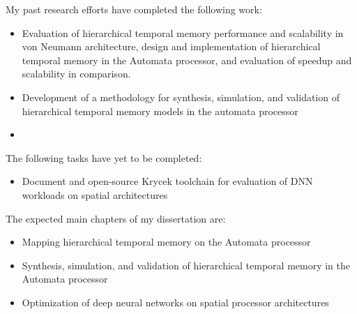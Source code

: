 My past research efforts have completed the following work:

\begin{itemize}
    \item Evaluation of hierarchical temporal memory performance and scalability in von Neumann architecture, design and implementation of hierarchical temporal memory in the Automata processor, and evaluation of speedup and scalability in comparison.
    \item Development of a methodology for synthesis, simulation, and validation of hierarchical temporal memory models in the automata processor
    \item 
\end{itemize}

The following tasks have yet to be completed:

\begin{itemize}
    \item Document and open-source Krycek toolchain for evaluation of DNN workloads on spatial architectures
\end{itemize}

The expected main chapters of my dissertation are:

\begin{itemize}
    \item Mapping hierarchical temporal memory on the Automata processor
    \item Synthesis, simulation, and validation of hierarchical temporal memory in the Automata processor
    \item Optimization of deep neural networks on spatial processor architectures
\end{itemize}
